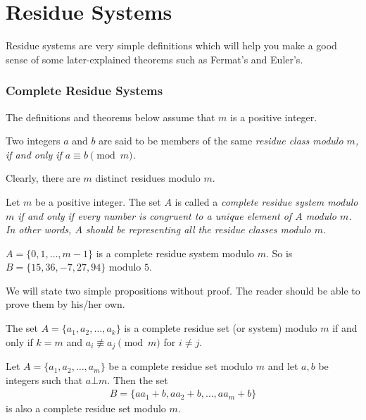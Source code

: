 \documentclass{subfile}
\begin{document}
	\section{Residue Systems}
	Residue systems are very simple definitions which will help you make a good sense of some later-explained theorems such as Fermat's and Euler's.
	\subsubsection{Complete Residue Systems}
	The definitions and theorems below assume that $m$ is a positive integer.
		\begin{definition}
			Two integers $a$ and $b$ are said to be members of the same \slshape{residue class} modulo $m$, if and only if $a \equiv b \pmod m$.
		\end{definition}
		
		Clearly, there are $m$ distinct residues modulo $m$.
		
		\begin{definition}\label{def:completeresiduesystem}
			Let $m$ be a positive integer. The set $A$ is called a \slshape{complete residue system modulo $m$} if and only if every number is congruent to a unique element of $A$ modulo $m$. In other words, $A$ should be representing all the residue classes modulo $m$.
		\end{definition}
		
		\begin{example}
			$A = \{0,1, \ldots, m-1\}$ is a complete residue system modulo $m$. So is $B=\{15, 36, -7, 27, 94\}$ modulo $5$.
		\end{example}
	We will state two simple propositions without proof. The reader should be able to prove them by his/her own.
	
	\begin{proposition}
		The set $A=\{a_1, a_2, \ldots, a_k\}$ is a complete residue set (or system) modulo $m$ if and only if $k=m$ and $a_i \not\equiv a_j \pmod m$ for $i \neq j$.
	\end{proposition}
	
	\begin{proposition} \label{prop:generalcompletesystem}
		Let $A=\{a_1, a_2, \ldots, a_m\}$ be a complete residue set modulo $m$ and let $a,b$ be integers such that $a \bot m$. Then the set
		\begin{align*}
			B=\{aa_1+b, aa_2+b, \ldots, aa_m+b\}
		\end{align*}
		is also a complete residue set modulo $m$.
	\end{proposition}
	
\end{document}
